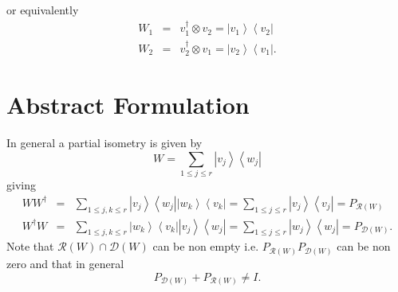 \documentclass{article}
\begin{document}
or equivalently 
\begin{eqnarray}
W_{1} &=&v_{1}^{\dagger }\otimes v_{2}=\left\vert v_{1}\right\rangle
\left\langle v_{2}\right\vert \\
W_{2} &=&v_{2}^{\dagger }\otimes v_{1}=\left\vert v_{2}\right\rangle
\left\langle v_{1}\right\vert .
\end{eqnarray}

\section{Abstract Formulation}

In general a partial isometry is given by 
\begin{equation}
W=\sum_{1\leq j\leq r}\left\vert v_{j}\right\rangle \left\langle
w_{j}\right\vert
\end{equation}%
giving 
\begin{eqnarray}
WW^{\dagger } &=&\sum_{1\leq j,k\leq r}\left\vert v_{j}\right\rangle
\left\langle w_{j}\right\vert \left\vert w_{k}\right\rangle \left\langle
v_{k}\right\vert =\sum_{1\leq j\leq r}\left\vert v_{j}\right\rangle
\left\langle v_{j}\right\vert =P_{\mathcal{R}\left( W\right) } \\
W^{\dagger }W &=&\sum_{1\leq j,k\leq r}\left\vert w_{k}\right\rangle
\left\langle v_{k}\right\vert \left\vert v_{j}\right\rangle \left\langle
w_{j}\right\vert =\sum_{1\leq j\leq r}\left\vert w_{j}\right\rangle
\left\langle w_{j}\right\vert =P_{\mathcal{D}\left( W\right) }.
\end{eqnarray}%
Note that $\mathcal{R}\left( W\right) \cap \mathcal{D}\left( W\right) $ can
be non empty i.e. $P_{\mathcal{R}\left( W\right) }P_{\mathcal{D}\left(
W\right) }$ can be non zero and that in general 
\begin{equation}
P_{\mathcal{D}\left( W\right) }+P_{\mathcal{R}\left( W\right) }\neq I.
\end{equation}
\end{document}
